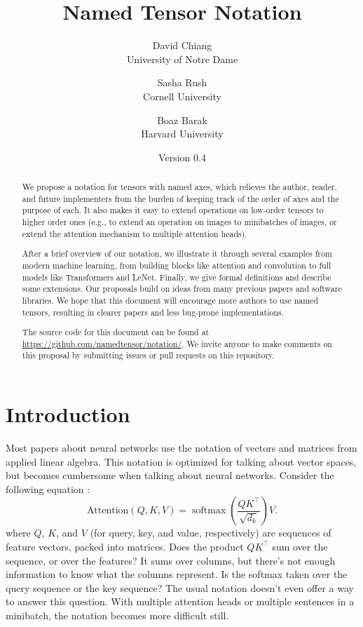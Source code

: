 \documentclass{article}
\title{\bf Named Tensor Notation}
\author{David Chiang \\ \small University of Notre Dame \and Sasha Rush \\ \small Cornell University \and Boaz Barak \\ \small Harvard University}
\date{Version 0.4}
\DeclareMathOperator*{\softmax}{softmax}
\begin{document}
\maketitle

\begin{abstract}
We propose a notation for tensors with named axes, which relieves the author, reader, and future implementers from the burden of keeping track of the order of axes and the purpose of each. It also makes it easy to extend operations on low-order tensors to higher order ones (e.g., to extend an operation on images to minibatches of images, or extend the attention mechanism to multiple attention heads).

After a brief overview of our notation, we illustrate it through several examples from modern machine learning, from building blocks like attention and convolution to full models like Transformers and LeNet. Finally, we give formal definitions and describe some extensions. Our proposals build on ideas from many previous papers and software libraries. We hope that this document will encourage more authors to use named tensors, resulting in clearer papers and less bug-prone implementations.

The source code for this document can be found at \url{https://github.com/namedtensor/notation/}. We invite anyone to make comments on this proposal by submitting issues or pull requests on this repository.
\end{abstract}

\setcounter{tocdepth}{1}
\tableofcontents

\clearpage

\section{Introduction}
\label{sec:intro}

Most papers about neural networks use the notation of vectors and matrices from applied linear algebra. This notation is optimized for talking about vector spaces, but becomes cumbersome when talking about neural networks. Consider the following equation \citep{vaswani+:2017}:
\[ \text{Attention}(Q, K, V) = \softmax \left( \frac{QK^\top}{\sqrt{d_k}} \right) V. \]
where $Q$, $K$, and $V$ (for query, key, and value, respectively) are sequences of feature vectors, packed into matrices. Does the product $QK^\top$ sum over the sequence, or over the features? It sums over columns, but there's not enough information to know what the columns represent. Is the softmax taken over the query sequence or the key sequence? The usual notation doesn't even offer a way to answer this question. With multiple attention heads or multiple sentences in a minibatch, the notation becomes more difficult still.
\end{document}
